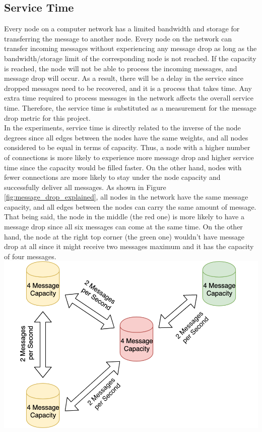 \documentclass[journal]{IEEEtran}
\begin{document}
\subsection{Service Time}
\noindent Every node on a computer network has a limited bandwidth and storage for transferring the message to another node. Every node on the network can transfer incoming messages without experiencing any message drop as long as the bandwidth/storage limit of the corresponding node is not reached. If the capacity is reached, the node will not be able to process the incoming messages, and message drop will occur. As a result, there will be a delay in the service since dropped messages need to be recovered, and it is a process that takes time. Any extra time required to process messages in the network affects the overall service time. Therefore, the service time is substituted as a measurement for the message drop metric for this project.\\

\noindent In the experiments, service time is directly related to the inverse of the node degrees since all edges between the nodes have the same weights, and all nodes considered to be equal in terms of capacity. Thus, a node with a higher number of connections is more likely to experience more message drop and higher service time since the capacity would be filled faster. On the other hand, nodes with fewer connections are more likely to stay under the node capacity and successfully deliver all messages. As shown in Figure \ref{fig:message_drop_explained}, all nodes in the network have the same message capacity, and all edges between the nodes can carry the same amount of message. That being said, the node in the middle (the red one) is more likely to have a message drop since all six messages can come at the same time. On the other hand, the node at the right top corner (the green one) wouldn't have message drop at all since it might receive two messages maximum and it has the capacity of four messages.\\

\begingroup
    \centering
    \bigskip
    \includegraphics[width=\columnwidth]{images/message_drop.png}
    \label{fig:message_drop_explained}
    \bigskip
\endgroup
\end{document}

